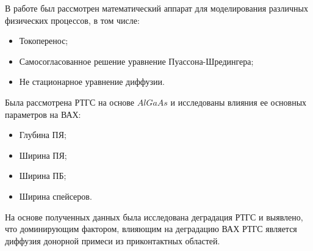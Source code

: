 \Conclusion
В работе был рассмотрен математический аппарат для моделирования различных физических процессов, в том числе:
\begin{itemize}
	\item Токоперенос;
	\item Самосогласованное решение уравнение Пуассона-Шредингера;
	\item Не стационарное уравнение диффузии.
\end{itemize}

Была рассмотрена РТГС на основе $AlGaAs$ и исследованы влияния ее основных параметров на ВАХ:
\begin{itemize}
	\item Глубина ПЯ;
	\item Ширина ПЯ;
	\item Ширина ПБ;
	\item Ширина спейсеров.
\end{itemize}

На основе полученных данных была исследована деградация РТГС и выявлено, что доминирующим фактором, влияющим на деградацию ВАХ РТГС является диффузия донорной примеси из приконтактных областей.